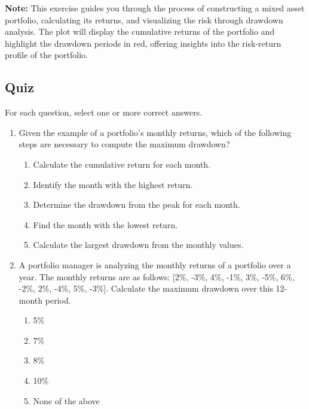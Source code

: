 \documentclass{article}
\begin{document}
\textbf{Note:} This exercise guides you through the process of constructing a mixed asset portfolio, calculating its returns, and visualizing the risk through drawdown analysis. The plot will display the cumulative returns of the portfolio and highlight the drawdown periods in red, offering insights into the risk-return profile of the portfolio.

\subsection{Quiz}
For each question, select one or more correct answers.

\begin{enumerate}
    \item Given the example of a portfolio's monthly returns, which of the following steps are necessary to compute the maximum drawdown?
        \begin{enumerate}
            \item Calculate the cumulative return for each month.
            \item Identify the month with the highest return.
            \item Determine the drawdown from the peak for each month.
            \item Find the month with the lowest return.
            \item Calculate the largest drawdown from the monthly values.
        \end{enumerate}

    \item A portfolio manager is analyzing the monthly returns of a portfolio over a year. The monthly returns are as follows: [2\%, -3\%, 4\%, -1\%, 3\%, -5\%, 6\%, -2\%, 2\%, -4\%, 5\%, -3\%]. Calculate the maximum drawdown over this 12-month period.
        \begin{enumerate}
            \item 5\%
            \item 7\%
            \item 8\%
            \item 10\%
            \item None of the above
        \end{enumerate}


\end{enumerate}
\end{document}
